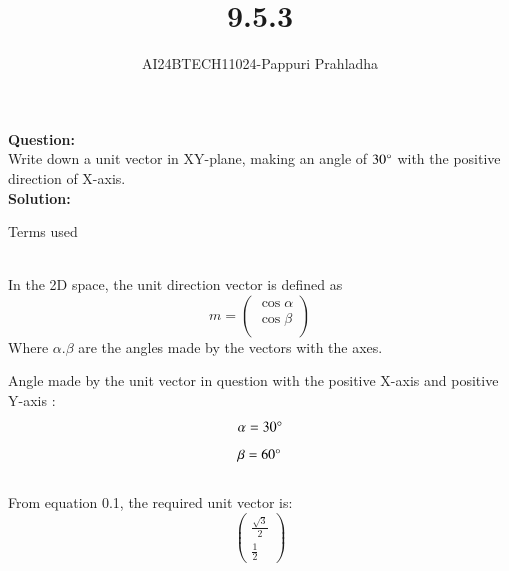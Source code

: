 \documentclass[journal]{IEEEtran}
\begin{document}

\vspace{3cm}

\title{9.5.3}
\author{AI24BTECH11024-Pappuri Prahladha}
{\let\newpage\relax\maketitle}

\renewcommand{\thefigure}{\theenumi}
\renewcommand{\thetable}{\theenumi}
\setlength{\intextsep}{10pt} %


\renewcommand{\thetable}{\theenumi}


\textbf{Question:}\\
Write down a unit vector in XY-plane, making an angle of $30\degree$ with the positive direction of X-axis.
\\
\textbf{Solution: }\\
\begin{table}[h!]
    \renewcommand{\thetable}{1}
    \centering
    
    \caption{Terms used}
    \label{TABLE 1:}
\end{table}\\
In the 2D space, the unit direction vector is defined as\\
\begin{equation}
    m=\begin{pmatrix}
        \cos\alpha\\
        \cos\beta\\
    \end{pmatrix}
\end{equation}
Where $\alpha.\beta$ are the angles made by the vectors with the axes.

Angle made by the unit vector in question with the positive X-axis and positive Y-axis $\colon$\\
\begin{equation}
    \alpha=30\degree
\end{equation}
\begin{equation}
    \beta=60\degree
\end{equation}\\
From equation 0.1, the required unit vector is$\colon$
\begin{equation*}
    \begin{pmatrix}
        \frac{\sqrt{3}}{2}\\
        \frac{1}{2}
    \end{pmatrix}
\end{equation*}
\end{document}
